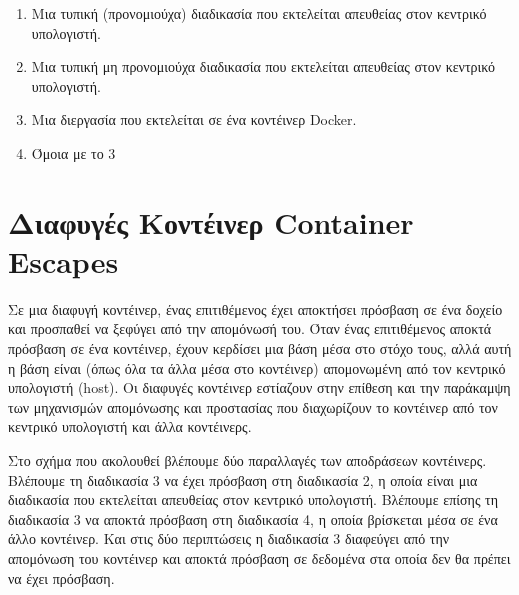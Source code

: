 \begin{enumerate}
    \item Μια τυπική (προνομιούχα) διαδικασία που εκτελείται απευθείας στον κεντρικό
    υπολογιστή.
    \item Μια τυπική μη προνομιούχα διαδικασία που εκτελείται απευθείας στον κεντρικό
    υπολογιστή.
    \item Μια διεργασία που εκτελείται σε ένα κοντέινερ \textlatin{Docker}.
    \item Όμοια με το 3
\end{enumerate}

\section{Διαφυγές Κοντέινερ \textlatin{Container Escapes}}

Σε μια διαφυγή κοντέινερ, ένας επιτιθέμενος έχει αποκτήσει πρόσβαση σε ένα
δοχείο και προσπαθεί να ξεφύγει από την απομόνωσή του. Όταν ένας επιτιθέμενος
αποκτά πρόσβαση σε ένα κοντέινερ, έχουν κερδίσει μια βάση μέσα στο στόχο τους,
αλλά αυτή η βάση είναι (όπως όλα τα άλλα μέσα στο κοντέινερ) απομονωμένη από
τον κεντρικό υπολογιστή (\textlatin{host}). Οι διαφυγές κοντέινερ εστίαζουν
στην επίθεση και την παράκαμψη των μηχανισμών απομόνωσης και προστασίας που
διαχωρίζουν το κοντέινερ από τον κεντρικό υπολογιστή και άλλα κοντέινερς.

Στο σχήμα που ακολουθεί βλέπουμε δύο παραλλαγές των αποδράσεων κοντέινερς.
Βλέπουμε τη διαδικασία 3 να έχει πρόσβαση στη διαδικασία 2, η οποία είναι μια
διαδικασία που εκτελείται απευθείας στον κεντρικό υπολογιστή.
Βλέπουμε επίσης τη διαδικασία 3 να αποκτά πρόσβαση στη διαδικασία 4, η οποία
βρίσκεται μέσα σε ένα άλλο κοντέινερ. Και στις δύο περιπτώσεις η διαδικασία 3
διαφεύγει από την απομόνωση του κοντέινερ και αποκτά πρόσβαση σε δεδομένα στα
οποία δεν θα πρέπει να έχει πρόσβαση.

